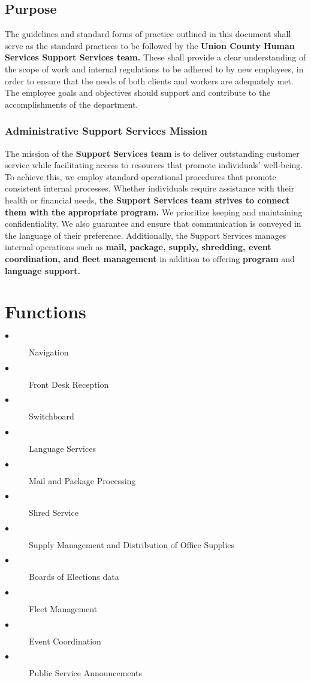 \documentclass{article}
\begin{document}
\subsection{Purpose}
The guidelines and standard forms of practice outlined in this document shall serve as the standard practices to be followed by the \textbf{Union County Human Services Support Services team.} These shall provide a clear understanding of the scope of work and internal regulations to be adhered to by new employees, in order to ensure that the needs of both clients and workers are adequately met. The employee goals and objectives should support and contribute to the accomplishments of the department.

\subsubsection{Administrative Support Services Mission}
The mission of the \textbf{Support Services team} is to deliver outstanding customer service while facilitating access to resources that promote individuals' well-being. To achieve this, we employ standard operational procedures that promote consistent internal processes. Whether individuals require assistance with their health or financial needs, \textbf{the Support Services team strives to connect them with the appropriate program.} We prioritize keeping and maintaining confidentiality. We also guarantee and ensure that communication is conveyed in the language of their preference. Additionally, the Support Services manages internal operations such as \textbf{mail, package, supply, shredding, event coordination, and fleet management} in addition to offering \textbf{program} and \textbf{language support.}

\section{Functions}

\begin{description}
    \item[$\bullet$] Navigation
    \item[$\bullet$] Front Desk Reception
    \item[$\bullet$] Switchboard
    \item[$\bullet$] Language Services
    \item[$\bullet$] Mail and Package Processing
    \item[$\bullet$] Shred Service
    \item[$\bullet$] Supply Management and Distribution of Office Supplies
    \item[$\bullet$] Boards of Elections data
    \item[$\bullet$] Fleet Management
    \item[$\bullet$] Event Coordination
    \item[$\bullet$] Public Service Announcements
\end{description}
\end{document}
